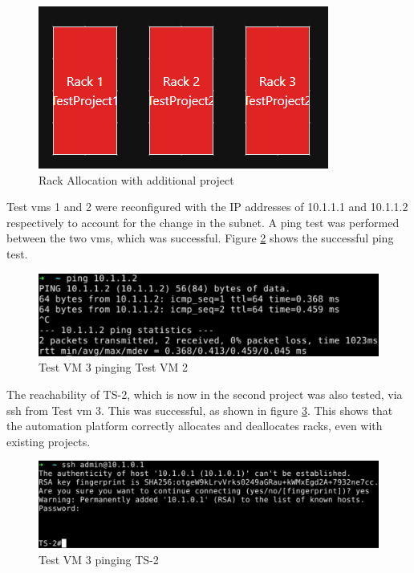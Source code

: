 \begin{figure}[H]
    \centering
    \includegraphics[scale=1.2]{images/two-projects-racks.png}
    \caption{Rack Allocation with additional project}
    \label{fig:two-projects-racks}
\end{figure}

Test \gls{vm}s 1 and 2 were reconfigured with the IP addresses of 10.1.1.1 and 10.1.1.2 respectively to account for the change in the subnet. A ping test was performed between the two \gls{vm}s, which was successful. Figure \ref{fig:two-projects-ping} shows the successful ping test.

\begin{figure}[H]
    \centering
    \includegraphics[scale=0.8]{images/two-projects-ping.png}
    \caption{Test VM 3 pinging Test VM 2}
    \label{fig:two-projects-ping}
\end{figure}

The reachability of TS-2, which is now in the second project was also tested, via \gls{ssh} from Test \gls{vm} 3. This was successful, as shown in figure \ref{fig:two-projects-ssh}. This shows that the automation platform correctly allocates and deallocates racks, even with existing projects.

\begin{figure}[H]
    \centering
    \includegraphics[scale=0.7]{images/two-projects-ssh.png}
    \caption{Test VM 3 pinging TS-2}
    \label{fig:two-projects-ssh}
\end{figure}

